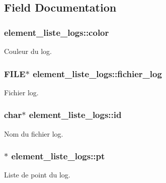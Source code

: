 \subsection{Field Documentation}
\subsubsection[{\texorpdfstring{color}{color}}]{ element\+\_\+liste\+\_\+logs\+::color}\hypertarget{structelement__liste__logs_a641d297d95cc924b33ff852f0b11e54d}{}\label{structelement__liste__logs_a641d297d95cc924b33ff852f0b11e54d}
Couleur du log. 
\subsubsection[{\texorpdfstring{fichier\+\_\+log}{fichier_log}}]{\setlength{\rightskip}{0pt plus 5cm}F\+I\+LE$\ast$ element\+\_\+liste\+\_\+logs\+::fichier\+\_\+log}\hypertarget{structelement__liste__logs_aa4352ee5157377d3dec9ea703caba011}{}\label{structelement__liste__logs_aa4352ee5157377d3dec9ea703caba011}
Fichier log. 
\subsubsection[{\texorpdfstring{id}{id}}]{\setlength{\rightskip}{0pt plus 5cm}char$\ast$ element\+\_\+liste\+\_\+logs\+::id}\hypertarget{structelement__liste__logs_a33dfa7251a6707297bdee089c3430b06}{}\label{structelement__liste__logs_a33dfa7251a6707297bdee089c3430b06}
Nom du fichier log. 
\subsubsection[{\texorpdfstring{pt}{pt}}]{$\ast$ element\+\_\+liste\+\_\+logs\+::pt}\hypertarget{structelement__liste__logs_adce612305681497b353dc661307261df}{}\label{structelement__liste__logs_adce612305681497b353dc661307261df}
Liste de point du log. 
